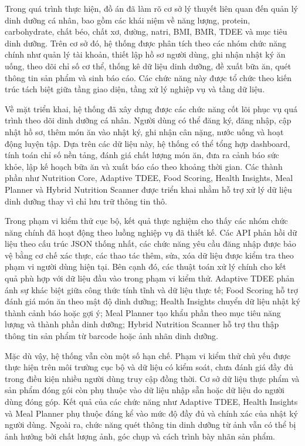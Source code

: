 \documentclass[12pt, a4paper]{report}
\begin{document}
Trong quá trình thực hiện, đồ án đã làm rõ cơ sở lý thuyết liên quan đến quản lý dinh dưỡng cá nhân, bao gồm các khái niệm về năng lượng, protein, carbohydrate, chất béo, chất xơ, đường, natri, BMI, BMR, TDEE và mục tiêu dinh dưỡng. Trên cơ sở đó, hệ thống được phân tích theo các nhóm chức năng chính như quản lý tài khoản, thiết lập hồ sơ người dùng, ghi nhận nhật ký ăn uống, theo dõi chỉ số cơ thể, thống kê dữ liệu dinh dưỡng, đề xuất bữa ăn, quét thông tin sản phẩm và sinh báo cáo. Các chức năng này được tổ chức theo kiến trúc tách biệt giữa tầng giao diện, tầng xử lý nghiệp vụ và tầng dữ liệu.

Về mặt triển khai, hệ thống đã xây dựng được các chức năng cốt lõi phục vụ quá trình theo dõi dinh dưỡng cá nhân. Người dùng có thể đăng ký, đăng nhập, cập nhật hồ sơ, thêm món ăn vào nhật ký, ghi nhận cân nặng, nước uống và hoạt động luyện tập. Dựa trên các dữ liệu này, hệ thống có thể tổng hợp dashboard, tính toán chỉ số nền tảng, đánh giá chất lượng món ăn, đưa ra cảnh báo sức khỏe, lập kế hoạch bữa ăn và xuất báo cáo theo khoảng thời gian. Các thành phần như Nutrition Core, Adaptive TDEE, Food Scoring, Health Insights, Meal Planner và Hybrid Nutrition Scanner được triển khai nhằm hỗ trợ xử lý dữ liệu dinh dưỡng thay vì chỉ lưu trữ thông tin thô.

Trong phạm vi kiểm thử cục bộ, kết quả thực nghiệm cho thấy các nhóm chức năng chính đã hoạt động theo luồng nghiệp vụ đã thiết kế. Các API phản hồi dữ liệu theo cấu trúc JSON thống nhất, các chức năng yêu cầu đăng nhập được bảo vệ bằng cơ chế xác thực, các thao tác thêm, sửa, xóa dữ liệu được kiểm tra theo phạm vi người dùng hiện tại. Bên cạnh đó, các thuật toán xử lý chính cho kết quả phù hợp với dữ liệu đầu vào trong phạm vi kiểm thử. Adaptive TDEE phản ánh sự khác biệt giữa công thức tính tĩnh và dữ liệu thực tế; Food Scoring hỗ trợ đánh giá món ăn theo mật độ dinh dưỡng; Health Insights chuyển dữ liệu nhật ký thành cảnh báo hoặc gợi ý; Meal Planner tạo khẩu phần theo mục tiêu năng lượng và thành phần dinh dưỡng; Hybrid Nutrition Scanner hỗ trợ thu thập thông tin sản phẩm từ barcode hoặc ảnh nhãn dinh dưỡng.

Mặc dù vậy, hệ thống vẫn còn một số hạn chế. Phạm vi kiểm thử chủ yếu được thực hiện trên môi trường cục bộ và dữ liệu có kiểm soát, chưa đánh giá đầy đủ trong điều kiện nhiều người dùng truy cập đồng thời. Cơ sở dữ liệu thực phẩm và sản phẩm đóng gói còn phụ thuộc vào dữ liệu nhập sẵn hoặc dữ liệu do người dùng đóng góp. Kết quả của các chức năng như Adaptive TDEE, Health Insights và Meal Planner phụ thuộc đáng kể vào mức độ đầy đủ và chính xác của nhật ký người dùng. Ngoài ra, chức năng quét thông tin dinh dưỡng từ ảnh vẫn có thể bị ảnh hưởng bởi chất lượng ảnh, góc chụp và cách trình bày nhãn sản phẩm.
\end{document}
